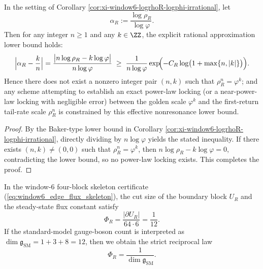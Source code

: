 \begin{corollary}\label{cor:xi-window6-alphaR-rational-approx-bound}
In the setting of Corollary \ref{cor:xi-window6-logrhoR-logphi-irrational}, let
\[
\alpha_R:=\frac{\log\rho_R}{\log\varphi}.
\]
Then for any integer \(n\ge 1\) and any \(k\in\ZZ\), the explicit rational approximation lower bound holds:
\[
\Bigl\lvert \alpha_R-\frac{k}{n}\Bigr\rvert
=\frac{\bigl|n\log\rho_R-k\log\varphi\bigr|}{n\log\varphi}
\;\ge\;
\frac{1}{n\log\varphi}\exp\!\Bigl(-C_R\log\bigl(1+\max\{n,|k|\}\bigr)\Bigr).
\]
Hence there does not exist a nonzero integer pair \((n,k)\) such that \(\rho_R^n=\varphi^k\);
and any scheme attempting to establish an exact power-law locking (or a near-power-law locking with negligible error) between the golden scale \(\varphi^k\) and the first-return tail-rate scale \(\rho_R^n\) is constrained by this effective nonresonance lower bound.
\end{corollary}
\begin{proof}
By the Baker-type lower bound in Corollary \ref{cor:xi-window6-logrhoR-logphi-irrational}, directly dividing by \(n\log\varphi\) yields the stated inequality.
If there exists \((n,k)\neq(0,0)\) such that \(\rho_R^n=\varphi^k\), then \(n\log\rho_R-k\log\varphi=0\), contradicting the lower bound, so no power-law locking exists. This completes the proof.
\end{proof}

\begin{corollary}\label{cor:xi-window6-reciprocal-flux-boson12}
In the window-\(6\) four-block skeleton certificate (\eqref{eq:window6_edge_flux_skeleton}), the cut size of the boundary block \(U_R\) and the steady-state flux constant satisfy
\[
\Phi_R=\frac{|\partial U_R|}{64\cdot 6}=\frac{1}{12}.
\]
If the standard-model gauge-boson count is interpreted as \(\dim\mathfrak g_{\mathrm{SM}}=1+3+8=12\), then we obtain the strict reciprocal law
\[
\Phi_R=\frac{1}{\dim\mathfrak g_{\mathrm{SM}}}.
\]
\end{corollary}


